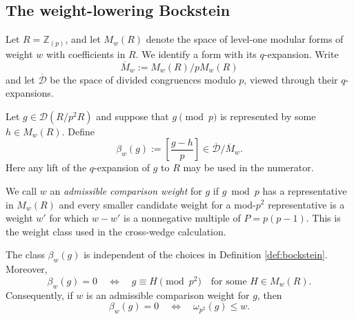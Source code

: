 \subsection{The weight-lowering Bockstein}

Let $R=\mathbb Z_{(p)}$, and let $M_w(R)$ denote the space of level-one
modular forms of weight $w$ with coefficients in $R$.  We identify a form
with its $q$-expansion.  Write
\[
  \overline M_w:=M_w(R)/pM_w(R)
\]
and let $\overline{\mathcal D}$ be the space of divided congruences modulo
$p$, viewed through their $q$-expansions.

\begin{definition}\label{def:bockstein}
Let $g\in\mathcal D(R/p^2R)$ and suppose that $g\pmod p$ is represented by
some $h\in M_w(R)$.  Define
\[
  \beta_w(g):=\left[\frac{g-h}{p}\right]
       \in \overline{\mathcal D}/\overline M_w.
\]
Here any lift of the $q$-expansion of $g$ to $R$ may be used in the
numerator.
\end{definition}

We call $w$ an \emph{admissible comparison weight} for $g$ if $g\bmod p$
has a representative in $M_w(R)$ and every smaller candidate weight for a
mod-$p^2$ representative is a weight $w'$ for which $w-w'$ is a
nonnegative multiple of $P=p(p-1)$.  This is the weight class used in the
cross-wedge calculation.

\begin{lemma}\label{lem:bockstein}
The class $\beta_w(g)$ is independent of the choices in Definition
\ref{def:bockstein}.  Moreover,
\[
  \beta_w(g)=0
  \quad\Longleftrightarrow\quad
  g\equiv H\pmod{p^2}
  \quad\text{for some }H\in M_w(R).
\]
Consequently, if $w$ is an admissible comparison weight for $g$, then
\[
  \beta_w(g)=0
  \quad\Longleftrightarrow\quad
  \omega_{p^2}(g)\le w.
\]
\end{lemma}

